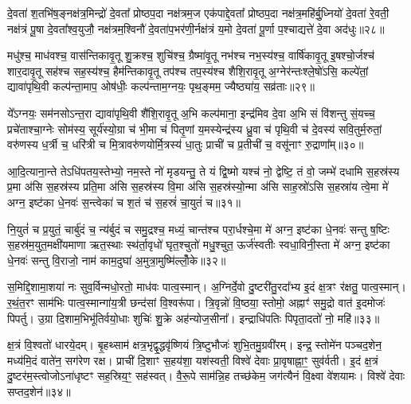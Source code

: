 दे॒वता॑ श॒तभि॑ष॒ङ्नक्ष॑त्र॒मिन्द्रो॑ दे॒वता᳚ प्रोष्ठप॒दा नक्ष॑त्रम॒ज एक॑पाद्दे॒वता᳚ प्रोष्ठप॒दा नक्ष॑त्र॒महि॑र्बु॒ध्नियो॑ दे॒वता॑ रे॒वती॒ नक्ष॑त्रं पू॒षा दे॒वता᳚श्व॒युजौ॒ नक्ष॑त्रम॒श्विनौ॑ दे॒वता॑प॒भर॑णी॒र्नक्ष॑त्रं य॒मो दे॒वता॑ पू॒र्णा प॒श्चाद्यत्ते॑ दे॒वा अद॑धुः॥२८॥

{\anuvakamend[{फल्गु॑नी॒ नक्ष॑त्रं॒ वस॑व॒स्त्रय॑स्त्रिꣳशच्च॥10॥}]}

मधु॑श्च॒ माध॑वश्च॒ वास॑न्तिकावृ॒तू शु॒क्रश्च॒ शुचि॑श्च॒ ग्रैष्मा॑वृ॒तू नभ॑श्च नभ॒स्य॑श्च॒ वार्\mbox{}षि॑कावृ॒तू इ॒षश्चो॒र्जश्च॑ शार॒दावृ॒तू सह॑श्च सह॒स्य॑श्च॒ हैम॑न्तिकावृ॒तू तप॑श्च तप॒स्य॑श्च शैशि॒रावृ॒तू अ॒ग्नेर॑न्तःश्ले॒षो॑\-ऽसि॒ कल्पे॑तां॒ द्यावा॑पृथि॒वी कल्प॑न्ता॒माप॒ ओष॑धीः॒ कल्प॑न्ताम॒ग्नयः॒ पृथ॒ङ्मम॒ ज्यैष्ठ्या॑य॒ सव्र॑ताः॥२९॥

ये᳚\-ऽग्नयः॒ सम॑नसो\-ऽन्त॒रा द्यावा॑पृथि॒वी शै॑शि॒रावृ॒तू अ॒भि कल्प॑माना॒ इन्द्र॑मिव दे॒वा अ॒भि सं वि॑शन्तु सं॒यच्च॒ प्रचे॑ताश्चा॒ग्नेः सोम॑स्य॒ सूर्य॑स्यो॒ग्रा च॑ भी॒मा च॑ पितृ॒णां य॒मस्येन्द्र॑स्य ध्रु॒वा च॑ पृथि॒वी च॑ दे॒वस्य॑ सवि॒तुर्म॒रुतां॒ वरु॑णस्य ध॒र्त्री च॒ धरि॑त्री च मि॒त्रावरु॑णयोर्मि॒त्रस्य॑ धा॒तुः प्राची॑ च प्र॒तीची॑ च॒ वसू॑नाꣳ रु॒द्राणा᳚म्॥३०॥

आ॒दि॒त्याना॒न्ते ते\-ऽधि॑पतय॒स्तेभ्यो॒ नम॒स्ते नो॑ मृडयन्तु॒ ते यं द्वि॒ष्मो यश्च॑ नो॒ द्वेष्टि॒ तं वो॒ जम्भे॑ दधामि स॒हस्र॑स्य प्र॒मा अ॑सि स॒हस्र॑स्य प्रति॒मा अ॑सि स॒हस्र॑स्य वि॒मा अ॑सि स॒हस्र॑स्यो॒न्मा अ॑सि साह॒स्रो॑\-ऽसि स॒हस्रा॑य त्वे॒मा मे॑ अग्न॒ इष्ट॑का धे॒नवः॑ स॒न्त्वेका॑ च श॒तं च॑ स॒हस्रं॑ चा॒युतं॑ च॥३१॥

नि॒युतं॑ च प्र॒युतं॒ चार्बु॑दं च॒ न्य॑र्बुदं च समु॒द्रश्च॒ मध्यं॒ चान्त॑श्च परा॒र्धश्चे॒मा मे॑ अग्न॒ इष्ट॑का धे॒नवः॑ सन्तु ष॒ष्टिः स॒हस्र॑म॒युत॒मक्षी॑यमाणा ऋत॒स्थाः स्थ॑र्ता॒वृधो॑ घृत॒श्चुतो॑ मधु॒श्चुत॒ ऊर्ज॑स्वतीः स्वधा॒विनी॒स्ता मे॑ अग्न॒ इष्ट॑का धे॒नवः॑ सन्तु वि॒राजो॒ नाम॑ काम॒दुघा॑ अ॒मुत्रा॒मुष्मि॑ल्लोँ॒के॥३२॥

{\anuvakamend[{सव्र॑ता रु॒द्राणा॑म॒युतं॑ च॒ पञ्च॑चत्वारिꣳशच्च॥11॥}]}

स॒मिद्दि॒शामा॒शया॑ नः सुव॒र्विन्मधो॒रतो॒ माध॑वः पात्व॒स्मान्। अ॒ग्निर्दे॒वो दु॒ष्टरी॑तु॒रदा᳚भ्य इ॒दं क्ष॒त्रꣳ र॑क्षतु॒ पात्व॒स्मान्। र॒थं॒त॒रꣳ साम॑भिः पात्व॒स्मान्गा॑य॒त्री छन्द॑सां वि॒श्वरू॑पा। त्रि॒वृन्नो॑ वि॒ष्ठया॒ स्तोमो॒ अह्नाꣳ॑ समु॒द्रो वात॑ इ॒दमोजः॑ पिपर्तु। उ॒ग्रा दि॒शाम॒भिभू॑तिर्वयो॒धाः शुचिः॑ शु॒क्रे अह॑न्योज॒सीना᳚। इन्द्राधि॑पतिः पिपृता॒दतो॑ नो॒ महि॑॥३३॥

क्ष॒त्रं वि॒श्वतो॑ धारये॒दम्। बृ॒हथ्साम॑ क्षत्र॒भृद्वृ॒द्धवृ॑ष्णियं त्रि॒ष्टुभौजः॑ शुभि॒तमु॒ग्रवी॑रम्। इन्द्र॒ स्तोमे॑न पञ्चद॒शेन॒ मध्य॑मि॒दं वाते॑न॒ सग॑रेण रक्ष। प्राची॑ दि॒शाꣳ स॒हय॑शा॒ यश॑स्वती॒ विश्वे॑ देवाः प्रा॒वृषाह्ना॒ꣳ॒ सुव॑र्वती। इ॒दं क्ष॒त्रं दु॒ष्टर॑म॒स्त्वोजो\-ऽना॑धृष्टꣳ सह॒स्रिय॒ꣳ॒ सह॑स्वत्। वै॒रू॒पे साम॑न्नि॒ह तच्छ॑केम॒ जग॑त्यैनं वि॒क्ष्वा वे॑शयामः। विश्वे॑ देवाः सप्तद॒शेन॑॥३४॥

